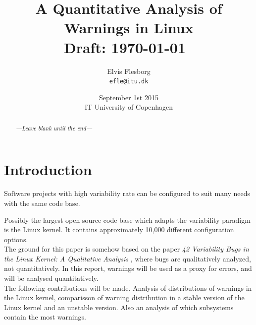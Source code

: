 \documentclass[a4paper,11pt]{report}
\begin{document}
\setlength{\parindent}{0cm}
\setlength{\unitlength}{1mm}

\date{September 1st 2015\\ IT University of Copenhagen}
\title{A Quantitative Analysis of Warnings in Linux \\ Draft: 
    \today~\currenttime}
\author{Elvis Flesborg\\
\texttt{efle@itu.dk}}
\clearpage\maketitle
\thispagestyle{empty}
\newpage

\tableofcontents
\thispagestyle{empty}



\newpage

\setcounter{page}{1}


\begin{abstract}
    \emph{---Leave blank until the end---}

\end{abstract}


\chapter{Introduction}
Software projects with high variability rate can be configured to suit many
needs with the same code base.

Possibly the largest open source code base which adapts the variability paradigm
is the Linux kernel. It contains approximately 10,000 different configuration 
options.
\\

The ground for this paper is somehow based on the paper \emph{42 Variability 
Bugs in the Linux Kernel: A Qualitative Analysis}
    \cite{42bugs}
, where bugs are qualitatively analyzed, not quantitatively. In this report, 
warnings will be used as a proxy for errors, and will be analysed 
quantitatively.
\\

The following contributions will be made. Analysis of distributions of
warnings in the Linux kernel, comparisson of warning distribution in a stable
version of the Linux kernel and an unstable version. Also an analysis of which
subsystems contain the most warnings.
\end{document}
